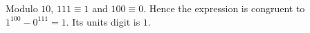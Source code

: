 Modulo $10$, $111\equiv1$ and $100\equiv0$. Hence the expression is congruent to $1^{100}-0^{111}=1$. Its units digit is $\boxed1$.
